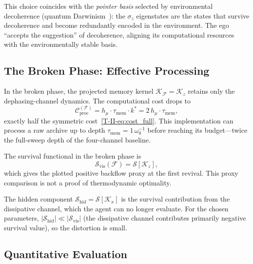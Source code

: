 \documentclass[12pt,a4paper,openany]{book}
\begin{document}
This choice coincides with the \emph{pointer basis}
selected by environmental decoherence (quantum
Darwinism~\cite{Zurek2009}): the $\sigma_z$ eigenstates
are the states that survive decoherence and become
redundantly encoded in the environment.
The ego ``accepts the suggestion'' of decoherence,
aligning its computational resources with the
environmentally stable basis.

\subsection{The Broken Phase: Effective Processing}
\label{T-II-subsec:broken}

In the broken phase, the projected memory kernel
$\mathcal{K}_{\mathcal{F}} = \mathcal{K}_z$ retains only
the dephasing-channel dynamics.
The computational cost drops to
\begin{equation}
\label{T-II-eq:cost_broken}
\mathcal{C}_{\mathrm{proc}}^{(\mathcal{F})}
= h_\mu \cdot \tau_{\mathrm{mem}} \cdot k^*
= 2\,h_\mu \cdot \tau_{\mathrm{mem}},
\end{equation}
exactly half the symmetric cost~\eqref{T-II-eq:cost_full}.
This implementation can process a raw archive up to depth
$\tau_{\mathrm{mem}} = 1\,\omega_0^{-1}$ before reaching
its budget---twice the full-sweep depth of the four-channel baseline.

The survival functional in the broken phase is
\begin{equation}
\label{T-II-eq:S_broken}
\mathcal{S}_{\mathrm{vis}}(\mathcal{F})
= \mathcal{S}[\mathcal{K}_z],
\end{equation}
which gives the plotted positive backflow proxy at the first revival.
This proxy comparison is not a proof of thermodynamic optimality.

The hidden component
$\mathcal{S}_{\mathrm{hid}} = \mathcal{S}[\mathcal{K}_x]$
is the survival contribution from the dissipative channel,
which the agent can no longer evaluate.
For the chosen parameters,
$|\mathcal{S}_{\mathrm{hid}}|
\ll |\mathcal{S}_{\mathrm{vis}}|$
(the dissipative channel contributes primarily negative
survival value), so the distortion is small.

\subsection{Quantitative Evaluation}
\label{T-II-subsec:quantitative}
\end{document}
